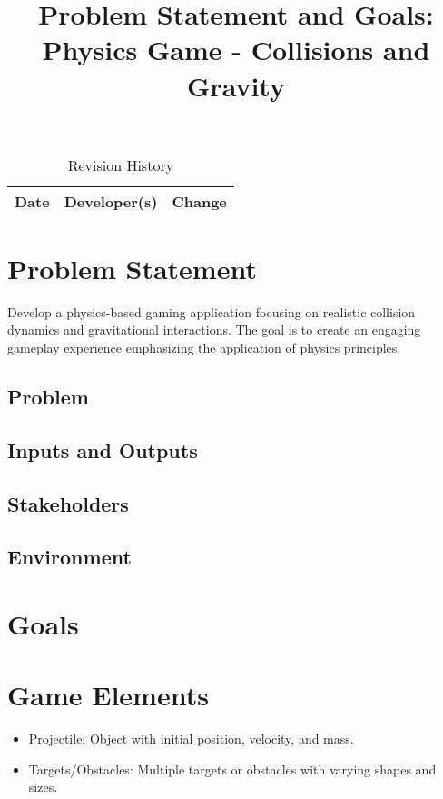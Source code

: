 \documentclass{article}
\title{Problem Statement and Goals: Physics Game - Collisions and Gravity}
\author{} %
\date{} %
\begin{document}
\maketitle

\begin{table}[hp]
\caption{Revision History} \label{TblRevisionHistory}
\begin{tabularx}{\textwidth}{llX}
\toprule
\textbf{Date} & \textbf{Developer(s)} & \textbf{Change}\\
\midrule
\bottomrule
\end{tabularx}
\end{table}

\section{Problem Statement}
Develop a physics-based gaming application focusing on realistic collision dynamics and gravitational interactions. The goal is to create an engaging gameplay experience emphasizing the application of physics principles.

\subsection{Problem}

\subsection{Inputs and Outputs}

\subsection{Stakeholders}

\subsection{Environment}

\section{Goals}

\section{Game Elements}
\begin{itemize}
    \item Projectile: Object with initial position, velocity, and mass.
    \item Targets/Obstacles: Multiple targets or obstacles with varying shapes and sizes.
\end{itemize}
\end{document}
